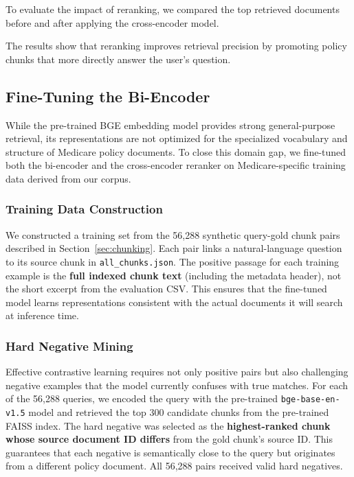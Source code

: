 \documentclass[10pt, letterpaper]{article}
\begin{document}
To evaluate the impact of reranking, we compared the top retrieved documents before and after applying the cross-encoder model.  

The results show that reranking improves retrieval precision by promoting policy chunks that more directly answer the user's question.

\subsection{Fine-Tuning the Bi-Encoder}

While the pre-trained BGE embedding model provides strong general-purpose retrieval, its
representations are not optimized for the specialized vocabulary and structure of Medicare
policy documents. To close this domain gap, we fine-tuned both the bi-encoder and the
cross-encoder reranker on Medicare-specific training data derived from our corpus.

\subsubsection{Training Data Construction}

We constructed a training set from the 56,288 synthetic query-gold chunk pairs described
in Section~\ref{sec:chunking}. Each pair links a natural-language question to its
source chunk in \texttt{all\_chunks.json}. The positive passage for each training example
is the \textbf{full indexed chunk text} (including the metadata header), not the short
excerpt from the evaluation CSV. This ensures that the fine-tuned model learns
representations consistent with the actual documents it will search at inference time.

\subsubsection{Hard Negative Mining}

Effective contrastive learning requires not only positive pairs but also challenging
negative examples that the model currently confuses with true matches. For each of the
56,288 queries, we encoded the query with the pre-trained \texttt{bge-base-en-v1.5}
model and retrieved the top 300 candidate chunks from the pre-trained FAISS index. The
hard negative was selected as the \textbf{highest-ranked chunk whose source document ID
differs} from the gold chunk's source ID. This guarantees that each negative is
semantically close to the query but originates from a different policy
document. All 56,288 pairs received valid hard negatives.
\end{document}
